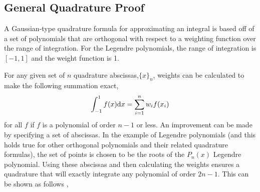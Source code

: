 \documentclass[preprint]{revtex4}
\newcommand{\dx}{{\rm d}x}
\newcommand{\intunit}{\ensuremath{\int_{-1}^{1}}}
\begin{document}
\subsection{General Quadrature Proof}
\label{genproof}
A Gaussian-type quadrature formula for approximating an integral is based off of
a set of polynomials that are orthogonal with respect to a weighting function over
the range of integration. For the Legendre polynomials, the range of integration is 
$[-1,1]$ and the weight function is 1. 

For any given set of $n$ quadrature abscissas,$\{x\}_n$, weights can be calculated to make
the following summation exact, 
\begin{equation}
\intunit f(x)\dx = \sum_{i=1}^nw_if(x_i)
\end{equation}
for all $f$ if $f$ is a polynomial of order $n-1$ or less. An improvement can be made
by specifying a set of abscissas. In the example of Legendre polynomials (and this holds
true for other orthogonal polynomials and their related quadrature formulas), the set
of points is chosen to be the roots of the $P_n(x)$ Legendre polynomial. Using these
abscissas and then calculating the weights ensures a quadrature that will exactly 
integrate any polynomial of order $2n-1$. This can be shown as follows
\cite{Burden_gaussquad}, 
\end{document}
